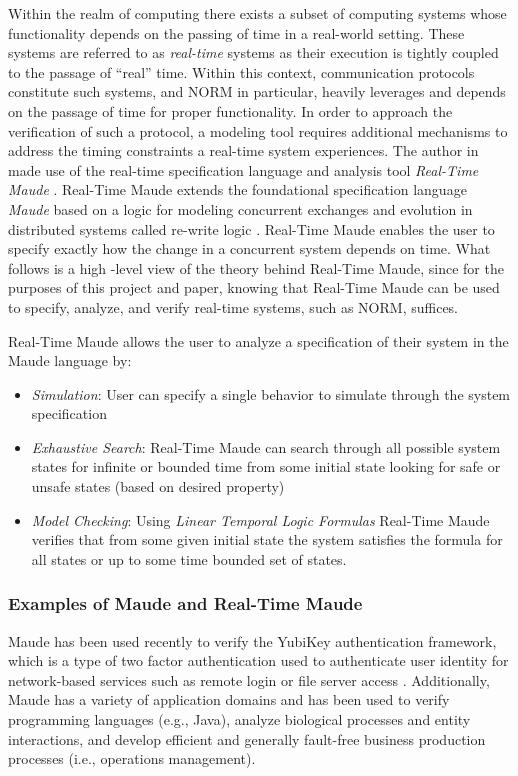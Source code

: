 \documentclass[10pt, journal]{IEEEtran}
\begin{document}
Within the realm of computing there exists a subset of computing systems whose functionality depends on the passing of time in a real-world setting. These systems are referred to as \textit{real-time} systems as their execution is tightly coupled to the passage of ``real'' time. Within this context, communication protocols constitute such systems, and NORM in particular, heavily leverages and depends on the passage of time for proper functionality. In order to approach the verification of such a protocol, a modeling tool requires additional mechanisms to address the timing constraints a real-time system experiences. The author in \cite{Lien2004} made use of the real-time specification language and analysis tool \textit{Real-Time Maude} \cite{rtmaudeUrl, Olvezky2004}. Real-Time Maude extends the foundational specification language \textit{Maude} \cite{maudeUrl, Clavel2002} based on a logic for modeling concurrent exchanges and evolution in distributed systems called re-write logic \cite{Meseguer1992}. Real-Time Maude enables the user to specify exactly how the change in a concurrent system depends on time. What follows is a high -level view of the theory behind Real-Time Maude, since for the purposes of this project and paper, knowing that Real-Time Maude can be used to specify, analyze, and verify real-time systems, such as NORM, suffices.

Real-Time Maude allows the user to analyze a specification of their system in the Maude language by:
\begin{itemize}
	\item \textit{Simulation}: User can specify a single behavior to simulate through the system specification
	\item \textit{Exhaustive Search}: Real-Time Maude can search through all possible system states for infinite or bounded time from some initial state looking for safe or unsafe states (based on desired property)
	\item \textit{Model Checking}: Using \textit{Linear Temporal Logic Formulas} Real-Time Maude verifies that from some given initial state the system satisfies the formula for all states or up to some time bounded set of states.
\end{itemize}

\subsubsection{Examples of Maude and Real-Time Maude}

Maude has been used recently to verify the YubiKey authentication framework, which is a type of two factor authentication used to authenticate user identity for network-based services such as remote login or file server access \cite{Escobar2018}. Additionally, Maude has a variety of application domains and has been used to verify programming languages (e.g., Java), analyze biological processes and entity interactions, and develop efficient and generally fault-free business production processes (i.e., operations management). 
\end{document}
